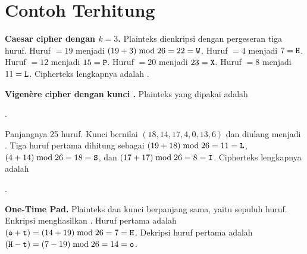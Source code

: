 \section{Contoh Terhitung}

\begin{example}
\textbf{Caesar cipher dengan $k=3$.} Plainteks  dienkripsi dengan pergeseran tiga huruf. Huruf 
$=19$ menjadi $(19+3) \bmod 26=22=\texttt{W}$. Huruf  $=4$ menjadi
$7=\texttt{H}$. Huruf  $=12$ menjadi $15=\texttt{P}$. Huruf  $=20$
menjadi $23=\texttt{X}$. Huruf  $=8$ menjadi $11=\texttt{L}$. Cipherteks
lengkapnya adalah .
\end{example}

\begin{example}
\textbf{Vigen\`ere cipher dengan kunci .} Plainteks yang dipakai
adalah
\begin{center}
.
\end{center}
Panjangnya 25 huruf. Kunci  bernilai $(18,14,17,4,0,13,6)$ dan
diulang menjadi . Tiga huruf pertama dihitung
sebagai $(19+18) \bmod 26=11=\texttt{L}$, $(4+14) \bmod 26=18=\texttt{S}$, dan
$(17+17) \bmod 26=8=\texttt{I}$. Cipherteks lengkapnya adalah
\begin{center}
.
\end{center}
\end{example}

\begin{example}
\textbf{One-Time Pad.} Plainteks  dan kunci
 berpanjang sama, yaitu sepuluh huruf. Enkripsi menghasilkan
. Huruf pertama adalah
$(\texttt{o}+\texttt{t})=(14+19) \bmod 26=7=\texttt{H}$. Dekripsi huruf pertama
adalah $(\texttt{H}-\texttt{t})=(7-19) \bmod 26=14=\texttt{o}$.
\end{example}
